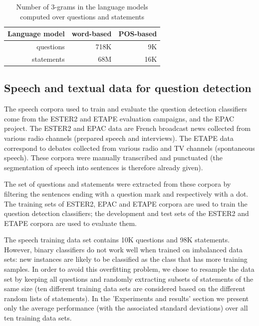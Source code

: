 \documentclass[conference]{IEEEtran}
\begin{document}
\begin{table}[!b]
\renewcommand{\arraystretch}{1.3}
\caption{Number of 3-grams in the language models computed over questions and statements}
\label{Tab:LMs}
\centering
\begin{tabular}{|r|r|r|}
\hline
{\bf Language model}  & word-based  & POS-based 	\\ \hline
questions     & 718K  &  9K  	\\ \hline
statements    &  68M  & 16K   	\\ \hline
\end{tabular}
\end{table}


\subsection{Speech and textual data for question detection}\label{data}

The speech corpora used to train and evaluate the question detection classifiers come from the ESTER2 \cite{Galliano:2009} and ETAPE \cite{Gravier:2012} evaluation campaigns, and the EPAC \cite{ESTEVE:2010} project. 
The ESTER2 and EPAC data are French broadcast news collected from various radio channels (prepared speech and interviews). 
The ETAPE data correspond to debates collected from various radio and TV channels (spontaneous speech). 
These corpora were manually transcribed and punctuated (the segmentation of speech into sentences is therefore already given).

The set of questions and statements were extracted from these corpora by filtering the sentences ending with a question mark and respectively with a dot.
The training sets of ESTER2, EPAC and ETAPE corpora are used to train the question detection classifiers; the development and test sets of the ESTER2 and ETAPE corpora are used to evaluate them.

The speech training data set contains 10K questions and 98K statements. 
However, binary classifiers do not work well when trained on imbalanced data sets: new instances are likely to be classified as the class that has more training samples. %
In order to avoid this overfitting problem, we chose to resample the data set by keeping all questions and randomly extracting subsets of statements of the same size (ten different training data sets are considered based on the different random lists of statements). 
In the 'Experiments and results' section we present only the average performance (with the associated standard deviations) over all ten training data sets. 
\end{document}
